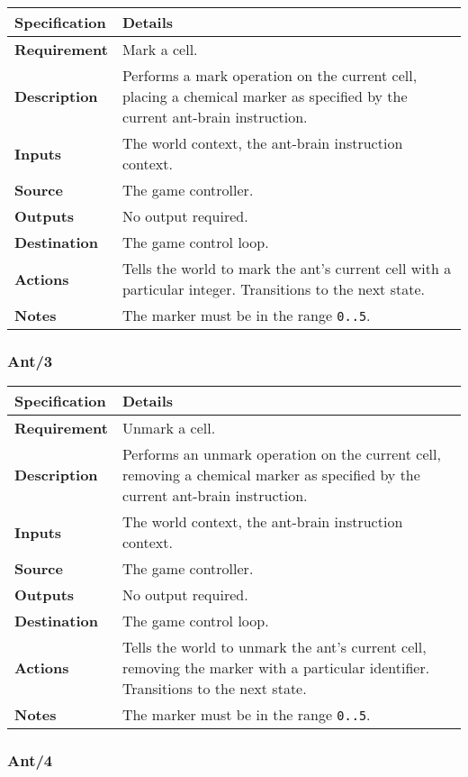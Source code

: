 \documentclass[11pt]{article}
\begin{document}
\begin{longtable}[c]{@{\extracolsep{\fill}}|p{}|p{}|@{}}
\hline
Specification & Details\tabularnewline
\hline

\textbf{Requirement} & Mark a cell.\tabularnewline
\textbf{Description} & Performs a mark operation on the current cell,
placing a chemical marker as specified by the current ant-brain
instruction.\tabularnewline
\textbf{Inputs} & The world context, the ant-brain instruction
context.\tabularnewline
\textbf{Source} & The game controller.\tabularnewline
\textbf{Outputs} & No output required.\tabularnewline
\textbf{Destination} & The game control loop.\tabularnewline
\textbf{Actions} & Tells the world to mark the ant's current cell with a
particular integer. Transitions to the next state.\tabularnewline
\textbf{Notes} & The marker must be in the range
\texttt{0..5}.\tabularnewline
\hline
\end{longtable}

\subsubsection*{Ant/3}\label{ant3}

\begin{longtable}[c]{@{\extracolsep{\fill}}|p{}|p{}|@{}}
\hline
Specification & Details\tabularnewline
\hline

\textbf{Requirement} & Unmark a cell.\tabularnewline
\textbf{Description} & Performs an unmark operation on the current cell,
removing a chemical marker as specified by the current ant-brain
instruction.\tabularnewline
\textbf{Inputs} & The world context, the ant-brain instruction
context.\tabularnewline
\textbf{Source} & The game controller.\tabularnewline
\textbf{Outputs} & No output required.\tabularnewline
\textbf{Destination} & The game control loop.\tabularnewline
\textbf{Actions} & Tells the world to unmark the ant's current cell,
removing the marker with a particular identifier. Transitions to the
next state.\tabularnewline
\textbf{Notes} & The marker must be in the range
\texttt{0..5}.\tabularnewline
\hline
\end{longtable}

\subsubsection*{Ant/4}\label{ant4}
\end{document}
